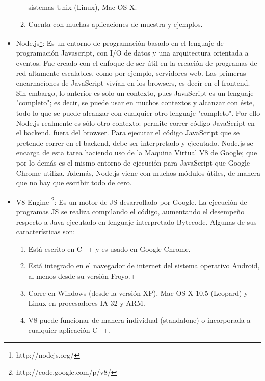\begin{itemize}
\begin{enumerate}
      sistemas Unix (Linux), Mac OS X.
    \item Cuenta con muchas aplicaciones de muestra y ejemplos.
   \end{enumerate}
 \item Node.js\footnote{http://nodejs.org/}: Es un entorno de programación basado en el lenguaje de programación 
  Javascript, con I/O de datos y una arquitectura orientada a eventos. Fue creado con el enfoque de ser
  útil en la creación de programas de red altamente escalables, como por ejemplo, servidores web.
  Las primeras encarnaciones de JavaScript vivían en los browsers, es decir en el frontend. Sin embargo, lo anterior es solo un contexto,
  pues JavaScript es un lenguaje "completo"; es decir, se puede  usar en muchos contextos y alcanzar con éste, todo lo que se puede
  alcanzar con cualquier otro lenguaje "completo".
  Por ello Node.js realmente es sólo otro contexto: permite correr código JavaScript en el backend, fuera del browser.
  Para ejecutar el código JavaScript que se pretende correr en el backend, debe ser interpretado y ejecutado. Node.js se encarga
  de esta tarea haciendo uso de la Maquina Virtual V8 de Google; que por lo demás es el mismo entorno de ejecución para JavaScript 
  que Google Chrome utiliza.
  Además, Node.js viene con muchos módulos útiles, de manera que no hay que escribir todo de cero.
 

 \item V8 Engine \footnote{http://code.google.com/p/v8/}: Es un motor de JS desarrollado por Google. La 
 ejecución de programas JS se realiza compilando el código, aumentando el desempeño respecto a Java ejecutado en lenguaje 
 interpretado Bytecode.
 Algunas de sus características son:
 \begin{enumerate}
  \item Está escrito en C++ y es usado en Google Chrome.
  \item Está integrado en el navegador de internet del sistema operativo Android, al menos desde su versión Froyo.+
  \item Corre en Windows (desde la versión XP), Mac OS X 10.5 (Leopard) y Linux en procesadores IA-32 y ARM.
  \item V8 puede funcionar de manera individual (standalone) o incorporada a cualquier aplicación C++.
 \end{enumerate}


\end{itemize}
